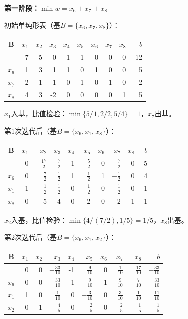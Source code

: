 \documentclass[12pt,a4paper]{article}
\begin{document}
\textbf{第一阶段：}$\min w = x_6 + x_7 + x_8$

初始单纯形表（基$B = \{x_6, x_7, x_8\}$）：

\begin{center}
\begin{tabular}{|c|rrrrrrrr|r|}
\hline
B & $x_1$ & $x_2$ & $x_3$ & $x_4$ & $x_5$ & $x_6$ & $x_7$ & $x_8$ & $b$ \\
\hline
 & -7 & -5 & 0 & -1 & 1 & 0 & 0 & 0 & -12 \\
\hline
$x_6$ & 1 & 3 & 1 & 1 & 0 & 1 & 0 & 0 & 5 \\
$x_7$ & 2 & -1 & 1 & 0 & -1 & 0 & 1 & 0 & 2 \\
$x_8$ & 4 & 3 & -2 & 0 & 0 & 0 & 0 & 1 & 5 \\
\hline
\end{tabular}
\end{center}

$x_1$入基，比值检验：$\min\{5/1, 2/2, 5/4\} = 1$，$x_7$出基。

第1次迭代后（基$B = \{x_6, x_1, x_8\}$）：

\begin{center}
\begin{tabular}{|c|rrrrrrrr|r|}
\hline
B & $x_1$ & $x_2$ & $x_3$ & $x_4$ & $x_5$ & $x_6$ & $x_7$ & $x_8$ & $b$ \\
\hline
 & 0 & $-\frac{17}{2}$ & $\frac{7}{2}$ & -1 & $-\frac{5}{2}$ & 0 & $\frac{7}{2}$ & 0 & -5 \\
\hline
$x_6$ & 0 & $\frac{7}{2}$ & $\frac{1}{2}$ & 1 & $\frac{1}{2}$ & 1 & $-\frac{1}{2}$ & 0 & 4 \\
$x_1$ & 1 & $-\frac{1}{2}$ & $\frac{1}{2}$ & 0 & $-\frac{1}{2}$ & 0 & $\frac{1}{2}$ & 0 & 1 \\
$x_8$ & 0 & 5 & -4 & 0 & 2 & 0 & -2 & 1 & 1 \\
\hline
\end{tabular}
\end{center}

$x_2$入基，比值检验：$\min\{4/(7/2), 1/5\} = 1/5$，$x_8$出基。

第2次迭代后（基$B = \{x_6, x_1, x_2\}$）：

\begin{center}
\begin{tabular}{|c|rrrrrrrr|r|}
\hline
B & $x_1$ & $x_2$ & $x_3$ & $x_4$ & $x_5$ & $x_6$ & $x_7$ & $x_8$ & $b$ \\
\hline
 & 0 & 0 & $-\frac{33}{10}$ & -1 & $\frac{9}{10}$ & 0 & $\frac{1}{10}$ & $\frac{17}{10}$ & $-\frac{33}{10}$ \\
\hline
$x_6$ & 0 & 0 & $\frac{33}{10}$ & 1 & $-\frac{9}{10}$ & 1 & $\frac{9}{10}$ & $-\frac{7}{10}$ & $\frac{33}{10}$ \\
$x_1$ & 1 & 0 & $\frac{1}{10}$ & 0 & $-\frac{3}{10}$ & 0 & $\frac{3}{10}$ & $\frac{1}{10}$ & $\frac{11}{10}$ \\
$x_2$ & 0 & 1 & $-\frac{4}{5}$ & 0 & $\frac{2}{5}$ & 0 & $-\frac{2}{5}$ & $\frac{1}{5}$ & $\frac{1}{5}$ \\
\hline
\end{tabular}
\end{center}
\end{document}

